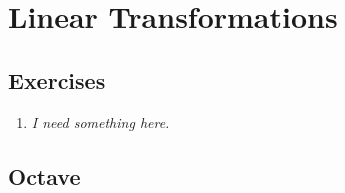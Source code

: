
\section{Linear Transformations}
\label{sec:linear-transform}

\subsection*{Exercises}

\begin{enumerate}

\item \emph{I need something here.}

\end{enumerate}

\subsection*{Octave}
